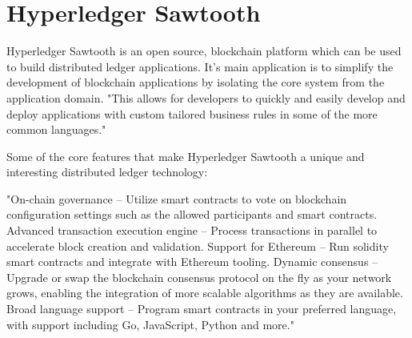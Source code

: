 \section{Hyperledger Sawtooth}

Hyperledger Sawtooth is an open source, blockchain platform which can be used 
to build distributed ledger applications. It’s main application is to simplify 
the development of blockchain applications by isolating the core system from the 
application domain. "This allows for developers to quickly and easily develop and
deploy applications with custom tailored business rules in some of the more 
common languages."~\cite{Hyperledger Sawtooth}

Some of the core features that make Hyperledger Sawtooth a unique and interesting 
distributed  ledger technology:
  
  "On-chain governance – Utilize smart contracts to vote on blockchain configuration 
  settings such as the allowed participants and smart contracts.
  Advanced transaction execution engine – Process transactions in parallel to accelerate 
  block creation and validation.
  Support for Ethereum – Run solidity smart contracts and integrate with Ethereum tooling.
  Dynamic consensus – Upgrade or swap the blockchain consensus protocol on the fly as your 
  network grows, enabling the integration of more scalable algorithms as they are available.
  Broad language support – Program smart contracts in your preferred language, with support 
  including Go, JavaScript, Python and more."~\cite{Linux Foundation Sawtooth}
